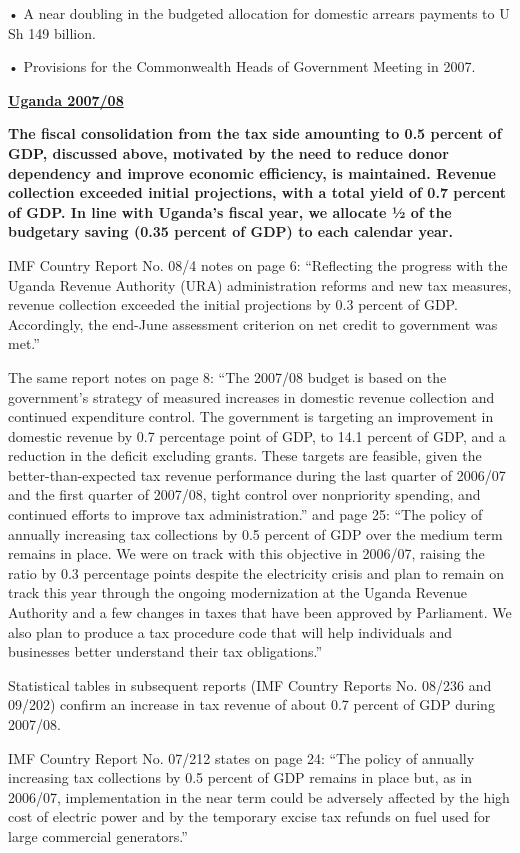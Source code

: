 • A near doubling in the budgeted allocation for domestic arrears payments to U Sh 149 billion.

• Provisions for the Commonwealth Heads of Government Meeting in 2007.

\textbf{\underline{Uganda 2007/08}}

\textbf{The fiscal consolidation from the tax side amounting to 0.5 percent of GDP, discussed above, motivated by the need to reduce donor dependency and improve economic efficiency, is maintained. Revenue collection exceeded initial projections, with a total yield of 0.7 percent of GDP. In line with Uganda’s fiscal year, we allocate ½ of the budgetary saving (0.35 percent of GDP) to each calendar year.}

IMF Country Report No. 08/4 notes on page 6: “Reflecting the progress with the Uganda Revenue Authority (URA) administration reforms and new tax measures, revenue collection exceeded the initial projections by 0.3 percent of GDP. Accordingly, the end-June assessment criterion on net credit to government was met.” 

The same report notes on page 8: “The 2007/08 budget is based on the government’s strategy of measured increases in domestic revenue collection and continued expenditure control. The government is targeting an improvement in domestic revenue by 0.7 percentage point of GDP, to 14.1 percent of GDP, and a reduction in the deficit excluding grants. These targets are feasible, given the better-than-expected tax revenue performance during the last quarter of 2006/07 and the first quarter of 2007/08, tight control over nonpriority spending, and continued efforts to improve tax administration.” and page 25: “The policy of annually increasing tax collections by 0.5 percent of GDP over the medium term remains in place. We were on track with this objective in 2006/07, raising the ratio by 0.3 percentage points despite the electricity crisis and plan to remain on track this year through the ongoing modernization at the Uganda Revenue Authority and a few changes in taxes that have been approved by Parliament. We also plan to produce a tax procedure code that will help individuals and businesses better understand their tax obligations.”

Statistical tables in subsequent reports (IMF Country Reports No. 08/236 and 09/202) confirm an increase in tax revenue of about 0.7 percent of GDP during 2007/08. 

IMF Country Report No. 07/212 states on page 24: “The policy of annually increasing tax collections by 0.5 percent of GDP remains in place but, as in 2006/07, implementation in the near term could be adversely affected by the high cost of electric power and by the temporary excise tax refunds on fuel used for large commercial generators.”

